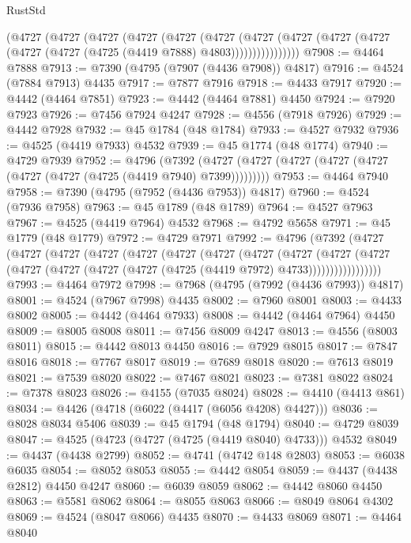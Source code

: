 \begin{lexlean}{RustStd}
\begin{coremodule}
          (@4727
            (@4727
              (@4727
                (@4727
                  (@4727
                    (@4727
                      (@4727
                        (@4727
                          (@4727 (@4727 (@4727 (@4727 (@4725 (@4419 @7888) @4803))))))))))))))))
@7908 := @4464 @7888
@7913 := @7390 (@4795 (@7907 (@4436 @7908)) @4817)
@7916 := @4524 (@7884 @7913) @4435
@7917 := @7877 @7916
@7918 := @4433 @7917
@7920 := @4442 (@4464 @7851)
@7923 := @4442 (@4464 @7881) @4450
@7924 := @7920 @7923
@7926 := @7456 @7924 @4247
@7928 := @4556 (@7918 @7926)
@7929 := @4442 @7928
@7932 := @45 @1784 (@48 @1784)
@7933 := @4527 @7932
@7936 := @4525 (@4419 @7933) @4532
@7939 := @45 @1774 (@48 @1774)
@7940 := @4729 @7939
@7952 := @4796
    (@7392 (@4727 (@4727 (@4727 (@4727 (@4727 (@4727 (@4727 (@4725 (@4419 @7940) @7399)))))))))
@7953 := @4464 @7940
@7958 := @7390 (@4795 (@7952 (@4436 @7953)) @4817)
@7960 := @4524 (@7936 @7958)
@7963 := @45 @1789 (@48 @1789)
@7964 := @4527 @7963
@7967 := @4525 (@4419 @7964) @4532
@7968 := @4792 @5658
@7971 := @45 @1779 (@48 @1779)
@7972 := @4729 @7971
@7992 := @4796
    (@7392
      (@4727
        (@4727
          (@4727
            (@4727
              (@4727
                (@4727
                  (@4727
                    (@4727
                      (@4727
                        (@4727
                          (@4727
                            (@4727 (@4727 (@4727 (@4727 (@4725 (@4419 @7972) @4733)))))))))))))))))
@7993 := @4464 @7972
@7998 := @7968 (@4795 (@7992 (@4436 @7993)) @4817)
@8001 := @4524 (@7967 @7998) @4435
@8002 := @7960 @8001
@8003 := @4433 @8002
@8005 := @4442 (@4464 @7933)
@8008 := @4442 (@4464 @7964) @4450
@8009 := @8005 @8008
@8011 := @7456 @8009 @4247
@8013 := @4556 (@8003 @8011)
@8015 := @4442 @8013 @4450
@8016 := @7929 @8015
@8017 := @7847 @8016
@8018 := @7767 @8017
@8019 := @7689 @8018
@8020 := @7613 @8019
@8021 := @7539 @8020
@8022 := @7467 @8021
@8023 := @7381 @8022
@8024 := @7378 @8023
@8026 := @4155 (@7035 @8024)
@8028 := @4410 (@4413 @861)
@8034 := @4426 (@4718 (@6022 (@4417 (@6056 @4208) @4427)))
@8036 := @8028 @8034 @5406
@8039 := @45 @1794 (@48 @1794)
@8040 := @4729 @8039
@8047 := @4525 (@4723 (@4727 (@4725 (@4419 @8040) @4733))) @4532
@8049 := @4437 (@4438 @2799)
@8052 := @4741 (@4742 @148 @2803)
@8053 := @6038 @6035
@8054 := @8052 @8053
@8055 := @4442 @8054
@8059 := @4437 (@4438 @2812) @4450 @4247
@8060 := @6039 @8059
@8062 := @4442 @8060 @4450
@8063 := @5581 @8062
@8064 := @8055 @8063
@8066 := @8049 @8064 @4302
@8069 := @4524 (@8047 @8066) @4435
@8070 := @4433 @8069
@8071 := @4464 @8040

\end{coremodule}
\end{lexlean}
